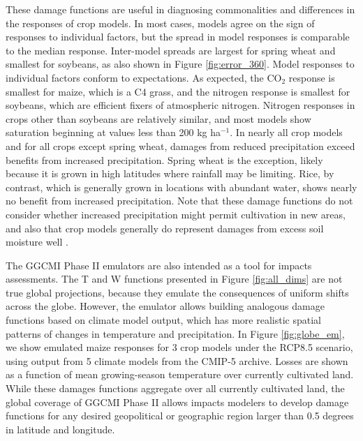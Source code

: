 \documentclass[gmdd]{copernicus} %
\begin{document}
These damage functions are useful in diagnosing commonalities and differences in the responses of crop models. 
In most cases, models agree on the sign of responses to individual factors, but the spread in model responses is comparable to the median response. Inter-model spreads are largest for spring wheat and smallest for soybeans, as also shown in Figure \ref{fig:error_360}.
Model responses to individual factors conform to expectations. As expected, the CO$_2$ response is smallest for maize, which is a C4 grass, and the nitrogen response is smallest for soybeans, which are efficient fixers of atmospheric nitrogen. Nitrogen responses in crops other than soybeans are relatively similar, and most models show saturation beginning at values less than 200 kg ha$^{-1}$.
 In nearly all crop models and for all crops except spring wheat, damages from reduced precipitation exceed benefits from increased precipitation. Spring wheat is the exception, likely because it is grown in high latitudes where rainfall may be limiting. Rice, by contrast, which is generally grown in locations with abundant water, shows nearly no benefit from increased precipitation.
Note that these damage functions do not consider whether increased precipitation might permit cultivation in new areas, and also that crop models generally do represent damages from excess soil moisture well \citep{Li2019}.

The GGCMI Phase II emulators are also intended as a tool for impacts assessments.
The T and W functions presented in Figure \ref{fig:all_dims} are not true global projections, because they emulate the consequences of uniform shifts across the globe. %
However, the emulator allows building analogous damage functions based on climate model output, which has more realistic spatial patterns of changes in temperature and precipitation. 
In Figure \ref{fig:globe_em}, we show emulated maize responses for 3 crop models under the RCP8.5 scenario, using output from 5 climate models from the CMIP-5 archive. Losses are shown as a function of mean growing-season temperature over currently cultivated land. While these damages functions aggregate over all currently cultivated land, the global coverage of GGCMI Phase II allows impacts modelers to develop damage functions for any desired geopolitical or geographic region larger than 0.5 degrees in latitude and longitude. 
\end{document}
